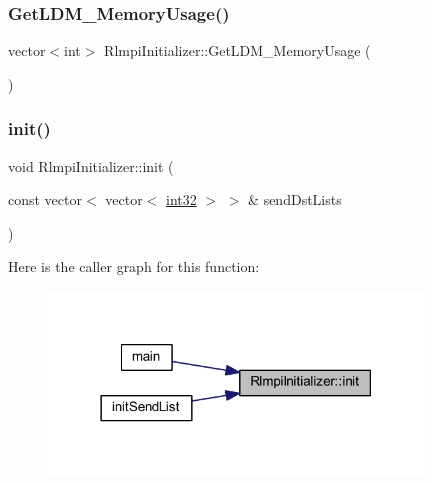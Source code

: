\mbox{\label{classRlmpiInitializer_a670d05937360d5f4146bcb3ace7dc6d9}} 
\subsubsection{\texorpdfstring{GetLDM\_MemoryUsage()}{GetLDM\_MemoryUsage()}\hspace{0.1cm}{\footnotesize\ttfamily [2/2]}}
{\footnotesize\ttfamily vector$<$int$>$ Rlmpi\+Initializer\+::\+Get\+L\+D\+M\+\_\+\+Memory\+Usage (\begin{DoxyParamCaption}{ }\end{DoxyParamCaption})}

\mbox{\label{classRlmpiInitializer_ac6e0829290daa590b36ef4cb7df852f0}} 
\subsubsection{\texorpdfstring{init()}{init()}\hspace{0.1cm}{\footnotesize\ttfamily [1/4]}}
{\footnotesize\ttfamily void Rlmpi\+Initializer\+::init (\begin{DoxyParamCaption}\item[{const vector$<$ vector$<$ \mbox{\hyperlink{include_2RlmpiShared_8h_a56f1a81c92849566ae864511088eb7e8}{int32}} $>$ $>$ \&}]{send\+Dst\+Lists }\end{DoxyParamCaption})}

Here is the caller graph for this function\+:
\nopagebreak
\begin{figure}[H]
\begin{center}
\leavevmode
\includegraphics[width=282pt]{classRlmpiInitializer_ac6e0829290daa590b36ef4cb7df852f0_icgraph}
\end{center}
\end{figure}
\mbox{\label{classRlmpiInitializer_ac6e0829290daa590b36ef4cb7df852f0}} 
